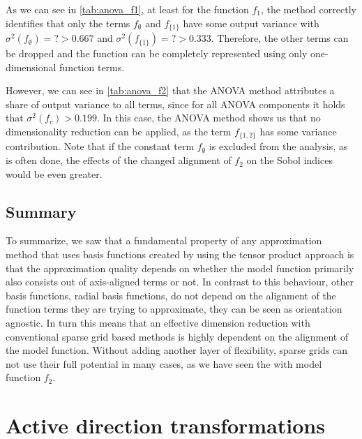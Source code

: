 \documentclass[
  a4paper,  %
  twoside,  %
  bibliography=totoc,
  headsepline,
  cleardoublepage=empty,
  parskip=half,
  draft=false
]{scrbook}
\begin{document}
As we can see in \cref{tab:anova_f1}, at least for the function $f_1$, the method correctly identifies that only the terms $f_\emptyset$ and $f_{\{1\}}$ have some output variance with $\sigma^2(f_\emptyset)=? > 0.667$ and $\sigma^2(f_{\{1\}})=? > 0.333$.
Therefore, the other terms can be dropped and the function can be completely represented using only one-dimensional function terms.

However, we can see in \cref{tab:anova_f2} that the ANOVA method attributes a share of output variance to all terms, since for all ANOVA components it holds that $\sigma^2(f_{c}) > 0.199$.
In this case, the ANOVA method shows us that no dimensionality reduction can be applied, as the term $f_{\{1,2\}}$ has some variance contribution.
Note that if the constant term $f_\emptyset$ is excluded from the analysis, as is often done, the effects of the changed alignment of $f_2$ on the Sobol indices would be even greater.

\subsection{Summary}

To summarize, we saw that a fundamental property of any approximation method that uses basis functions created by using the tensor product approach is that the approximation quality depends on whether the model function primarily also consists out of axis-aligned terms or not.
In contrast to this behaviour, other basis functions, \eg radial basis functions, do not depend on the alignment of the function terms they are trying to approximate, \ie they can be seen as orientation agnostic.
In turn this means that an effective dimension reduction with conventional sparse grid based methods is highly dependent on the alignment of the model function.
Without adding another layer of flexibility, sparse grids can not use their full potential in many cases, as we have seen the with model function $f_2$.

\section{Active direction transformations}
\end{document}
